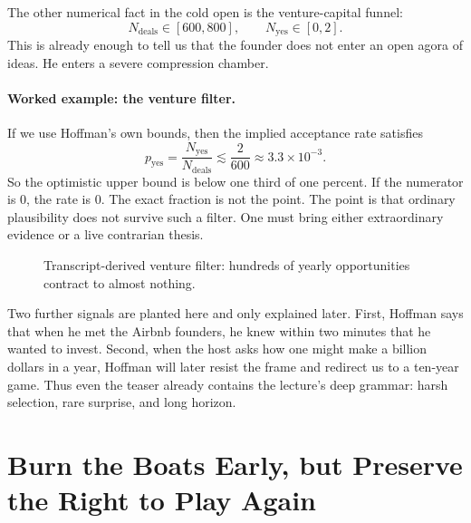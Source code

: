 The other numerical fact in the cold open is the venture-capital funnel:
\begin{equation}
N_{\mathrm{deals}} \in [600,800], \qquad N_{\mathrm{yes}} \in [0,2].
\end{equation}
This is already enough to tell us that the founder does not enter an open agora of ideas. He enters a severe compression chamber.

\paragraph{Worked example: the venture filter.}
If we use Hoffman's own bounds, then the implied acceptance rate satisfies
\begin{equation}
p_{\mathrm{yes}}=\frac{N_{\mathrm{yes}}}{N_{\mathrm{deals}}}\lesssim \frac{2}{600}\approx 3.3\times 10^{-3}.
\end{equation}
So the optimistic upper bound is below one third of one percent. If the numerator is \(0\), the rate is \(0\). The exact fraction is not the point. The point is that ordinary plausibility does not survive such a filter. One must bring either extraordinary evidence or a live contrarian thesis.

\begin{figure}
\begin{center}

{\small Transcript-derived venture filter: hundreds of yearly opportunities contract to almost nothing.}
\end{center}
\end{figure}

Two further signals are planted here and only explained later. First, Hoffman says that when he met the Airbnb founders, he knew within two minutes that he wanted to invest. Second, when the host asks how one might make a billion dollars in a year, Hoffman will later resist the frame and redirect us to a ten-year game. Thus even the teaser already contains the lecture's deep grammar: harsh selection, rare surprise, and long horizon.

\section{Burn the Boats Early, but Preserve the Right to Play Again}

